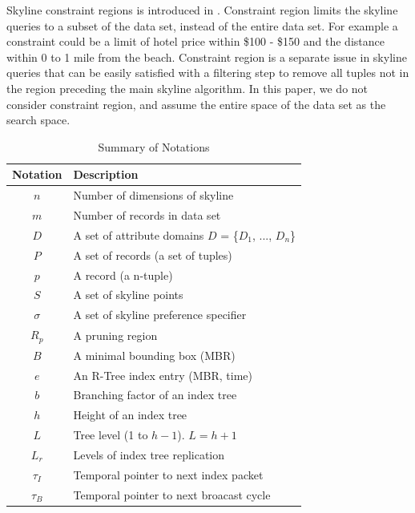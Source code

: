 \documentclass{sig-alternate}
\newtheorem{mydef}{Definition}
\begin{document}

Skyline constraint regions is introduced in
\cite{Ha:2009:EEP:1616994.1617050}.
Constraint region limits the skyline queries to a subset of the data
set, instead of the entire data set. For example a constraint could
be a limit of hotel price within \$100 - \$150 and the distance
within 0 to 1 mile from the beach.
Constraint region is a separate issue in skyline queries that can be easily
satisfied with a filtering step to remove all tuples not in the region
preceding the main skyline algorithm.
In this paper, we do not consider constraint region, and assume the
entire space of the data set as the search space.

\begin{table}[h]
\centering
\begin{tabular}{c|l}
\hline
{\bf Notation} & {\bf Description}\\
\hline
$n$ & Number of dimensions of skyline\\
$m$ & Number of records in data set\\
$D$ & A set of attribute domains $D$ = \{$D_1$, ..., $D_n$\}\\
$P$ & A set of records (a set of tuples)\\
$p$ & A record (a n-tuple)\\
$S$ & A set of skyline points\\
$\sigma$ & A set of skyline preference specifier\\
$R_p$ & A pruning region\\
$B$ & A minimal bounding box (MBR)\\
$e$ & An R-Tree index entry (MBR, time)\\
$b$ & Branching factor of an index tree\\
$h$ & Height of an index tree\\
$L$ & Tree level (1 to $h - 1$). $L = h + 1$\\
$L_r$ & Levels of index tree replication\\
$\tau_I$ & Temporal pointer to next index packet\\
$\tau_B$ & Temporal pointer to next broacast cycle\\

\hline
\end{tabular}
\caption{Summary of Notations}
\label{tab:index_attr}
\end{table}
\end{document}

